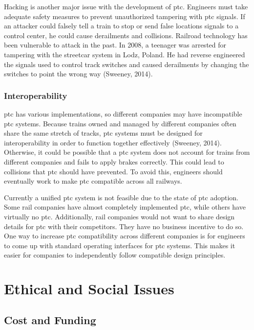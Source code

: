 \documentclass[11pt, titlepage]{article}
\begin{document}
Hacking is another major issue with the development of \gls{ptc}. Engineers must
take adequate safety measures to prevent unauthorized tampering with \gls{ptc}
signals. If an attacker could falsely tell a train to stop or send false locations
signals to a control center, he could cause derailments and collisions. Railroad
technology has been vulnerable to attack in the past. In 2008, a teenager was
arrested for tampering with the streetcar system in Lodz, Poland. He had reverse
engineered the signals used to control track switches and caused derailments by
changing the switches to point the wrong way (Sweeney, 2014).

\subsubsection{Interoperability}

\gls{ptc} has various implementations, so different companies may have incompatible
\gls{ptc} systems. Because trains owned and managed by different companies often
share the same stretch of tracks, \gls{ptc} systems must be designed for
interoperability in order to function together effectively (Sweeney, 2014).
Otherwise, it could be possible that a \gls{ptc} system does not account for trains
from different companies and fails to apply brakes correctly. This could lead to
collisions that \gls{ptc} should have prevented. To avoid this, engineers should
eventually work to make \gls{ptc} compatible across all railways.

Currently a unified \gls{ptc} system is not feasible due to the state of \gls{ptc}
adoption. Some rail companies have almost completely implemented \gls{ptc}, while
others have virtually no \gls{ptc}. Additionally, rail companies would not want to
share design details for \gls{ptc} with their competitors. They have no business
incentive to do so. One way to increase \gls{ptc} compatibility across different
companies is for engineers to come up with standard operating interfaces for
\gls{ptc} systems. This makes it easier for companies to independently follow
compatible design principles.

\pagebreak

\section{Ethical and Social Issues}

\subsection{Cost and Funding}
\end{document}
